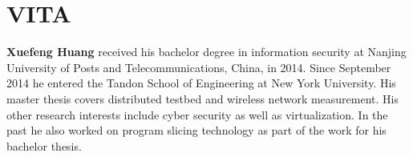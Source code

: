\chapter*{VITA}
\textbf{Xuefeng Huang} received his bachelor degree in information security at Nanjing University of Posts and Telecommunications, China, in 2014. Since September 2014 he entered the Tandon School of Engineering at New York University. His master thesis covers distributed testbed and wireless network measurement. His other research interests include cyber security as well as virtualization. In the past he also worked on program slicing technology as part of the work for his bachelor thesis.